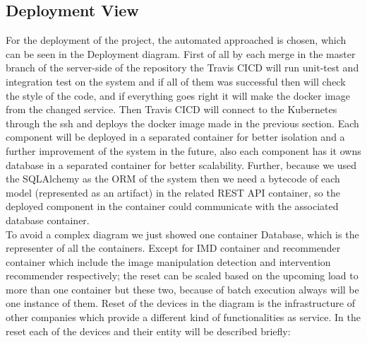\subsection{Deployment View}
For the deployment of the project, the automated approached is chosen, which can be seen in the Deployment diagram. First of all by each merge in the master branch of the server-side of the repository the Travis CI\/CD will run unit-test and integration test on the system and if all of them was successful then will check the style of the code, and if everything goes right it will make the docker image from the changed service. Then Travis CI\/CD will connect to the Kubernetes through the ssh and deploys the docker image made in the previous section. Each component will be deployed in a separated container for better isolation and a further improvement of the system in the future, also each component has it owns database in a separated container for better scalability. Further, because we used the SQLAlchemy as the ORM of the system then we need a bytecode of each model (represented as an artifact) in the related REST API container, so the deployed component in the container could communicate with the associated database container.\\
To avoid a complex diagram we just showed one container Database, which is the representer of all the containers. Except for IMD container and recommender container which include the image manipulation detection and intervention recommender respectively; the reset can be scaled based on the upcoming load to more than one container but these two, because of batch execution always will be one instance of them.  Reset of the devices in the diagram is the infrastructure of other companies which provide a different kind of functionalities as service. In the reset each of the devices and their entity will be described briefly:\\
